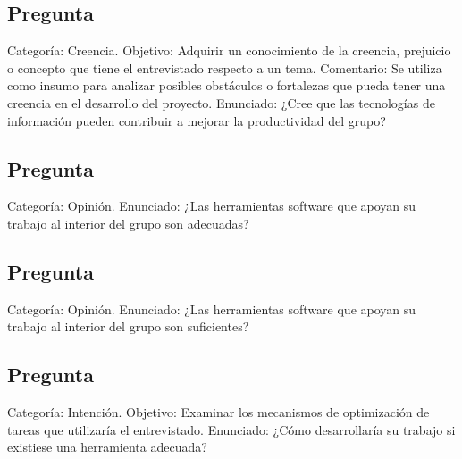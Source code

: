 \subsection{Pregunta}
Categoría: Creencia.
Objetivo: Adquirir un conocimiento de la creencia, prejuicio o concepto que tiene el entrevistado respecto a un tema.
Comentario: Se utiliza como insumo para analizar posibles obstáculos o fortalezas que pueda tener una creencia en el desarrollo del proyecto.
Enunciado: ¿Cree que las tecnologías de información pueden contribuir a mejorar la productividad del grupo?

\subsection{Pregunta}
Categoría: Opinión.
Enunciado: ¿Las herramientas software que apoyan su trabajo al interior del grupo son adecuadas?

\subsection{Pregunta}
Categoría: Opinión.
Enunciado: ¿Las herramientas software que apoyan su trabajo al interior del grupo son suficientes?

\subsection{Pregunta}
Categoría: Intención.
Objetivo: Examinar los mecanismos de optimización de tareas que utilizaría el entrevistado.
Enunciado: ¿Cómo desarrollaría su trabajo si existiese una herramienta adecuada?











